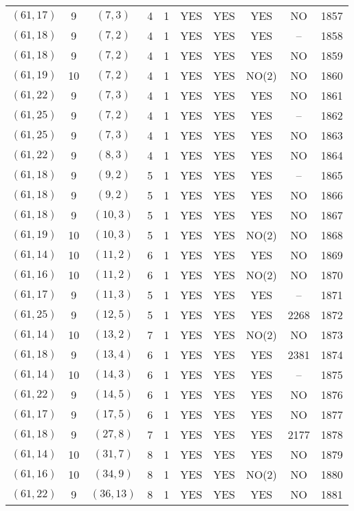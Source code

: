 \begin{longtable}{|c|c|c|c|c|c|c|c|c|c|}
$(61, 17)$ & 9 & $(7, 3)$ & 4 & 1 & YES & YES & YES & NO & 1857\\
$(61, 18)$ & 9 & $(7, 2)$ & 4 & 1 & YES & YES & YES & -- & 1858\\
$(61, 18)$ & 9 & $(7, 2)$ & 4 & 1 & YES & YES & YES & NO & 1859\\
$(61, 19)$ & 10 & $(7, 2)$ & 4 & 1 & YES & YES & NO(2) & NO & 1860\\
$(61, 22)$ & 9 & $(7, 3)$ & 4 & 1 & YES & YES & YES & NO & 1861\\
$(61, 25)$ & 9 & $(7, 2)$ & 4 & 1 & YES & YES & YES & -- & 1862\\
$(61, 25)$ & 9 & $(7, 3)$ & 4 & 1 & YES & YES & YES & NO & 1863\\
$(61, 22)$ & 9 & $(8, 3)$ & 4 & 1 & YES & YES & YES & NO & 1864\\
$(61, 18)$ & 9 & $(9, 2)$ & 5 & 1 & YES & YES & YES & -- & 1865\\
$(61, 18)$ & 9 & $(9, 2)$ & 5 & 1 & YES & YES & YES & NO & 1866\\
$(61, 18)$ & 9 & $(10, 3)$ & 5 & 1 & YES & YES & YES & NO & 1867\\
$(61, 19)$ & 10 & $(10, 3)$ & 5 & 1 & YES & YES & NO(2) & NO & 1868\\
$(61, 14)$ & 10 & $(11, 2)$ & 6 & 1 & YES & YES & YES & NO & 1869\\
$(61, 16)$ & 10 & $(11, 2)$ & 6 & 1 & YES & YES & NO(2) & NO & 1870\\
$(61, 17)$ & 9 & $(11, 3)$ & 5 & 1 & YES & YES & YES & -- & 1871\\
$(61, 25)$ & 9 & $(12, 5)$ & 5 & 1 & YES & YES & YES & 2268 & 1872\\
$(61, 14)$ & 10 & $(13, 2)$ & 7 & 1 & YES & YES & NO(2) & NO & 1873\\
$(61, 18)$ & 9 & $(13, 4)$ & 6 & 1 & YES & YES & YES & 2381 & 1874\\
$(61, 14)$ & 10 & $(14, 3)$ & 6 & 1 & YES & YES & YES & -- & 1875\\
$(61, 22)$ & 9 & $(14, 5)$ & 6 & 1 & YES & YES & YES & NO & 1876\\
$(61, 17)$ & 9 & $(17, 5)$ & 6 & 1 & YES & YES & YES & NO & 1877\\
$(61, 18)$ & 9 & $(27, 8)$ & 7 & 1 & YES & YES & YES & 2177 & 1878\\
$(61, 14)$ & 10 & $(31, 7)$ & 8 & 1 & YES & YES & YES & NO & 1879\\
$(61, 16)$ & 10 & $(34, 9)$ & 8 & 1 & YES & YES & NO(2) & NO & 1880\\
$(61, 22)$ & 9 & $(36, 13)$ & 8 & 1 & YES & YES & YES & NO & 1881\\

\end{longtable}
